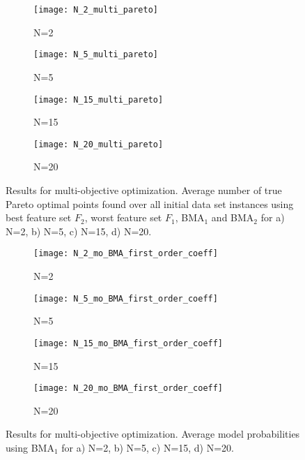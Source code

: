 \documentclass[preprint,amsmath,amssymb,aps, prb,showkeys]{revtex4-1}
\begin{document}
\begin{figure}[htp]
        \parbox{.975\textwidth}{
            \begin{subfigure}{.475\linewidth}
                \texttt{[image: N\_2\_multi\_pareto]}
                \caption{N=2}
                \label{fig:MO_pareto_N_2}
        \end{subfigure}
        	\begin{subfigure}{.475\linewidth}
                \texttt{[image: N\_5\_multi\_pareto]}
                \caption{N=5}
                \label{fig:MO_pareto_N_5}
        \end{subfigure}
        	\begin{subfigure}{.475\linewidth}
                \texttt{[image: N\_15\_multi\_pareto]}
                \caption{N=15}
                \label{fig:MO_pareto_N_15}
        \end{subfigure}
        	\begin{subfigure}{.475\linewidth}
                \texttt{[image: N\_20\_multi\_pareto]}
                \caption{N=20}
                \label{fig:MO_pareto_N_20}
        \end{subfigure}
        }
        \caption{ Results for multi-objective optimization. Average number of true Pareto optimal points found over all initial data set instances using best feature set $F_2$, worst feature set $F_1$, BMA$_1$ and BMA$_2$ for a) N=2, b) N=5, c) N=15, d) N=20.}
        \label{fig:MO_pareto}      
\end{figure} 

\begin{figure}[htp]
        \parbox{.975\textwidth}{
            \begin{subfigure}{.475\linewidth}
                \texttt{[image: N\_2\_mo\_BMA\_first\_order\_coeff]}
                \caption{N=2}
                \label{fig:mo_fo_coeff_N_2_BMA}
        \end{subfigure}
            \begin{subfigure}{.475\linewidth}
                \texttt{[image: N\_5\_mo\_BMA\_first\_order\_coeff]}
                \caption{N=5}
                \label{fig:mo_fo_coeff_N_5_BMA}
        \end{subfigure}
            \begin{subfigure}{.475\linewidth}
                \texttt{[image: N\_15\_mo\_BMA\_first\_order\_coeff]}
                \caption{N=15}
                \label{fig:mo_fo_coeff_N_15_BMA}
        \end{subfigure}
            \begin{subfigure}{.475\linewidth}
                \texttt{[image: N\_20\_mo\_BMA\_first\_order\_coeff]}
                \caption{N=20}
                \label{fig:mo_fo_coeff_N_20_BMA}
        \end{subfigure}
        }
        \caption{ Results for multi-objective optimization. Average model probabilities using BMA$_1$ for a) N=2, b) N=5, c) N=15, d) N=20.}
        \label{fig:mo_fo_coeff_BMA}     
\end{figure} 
\end{document}
